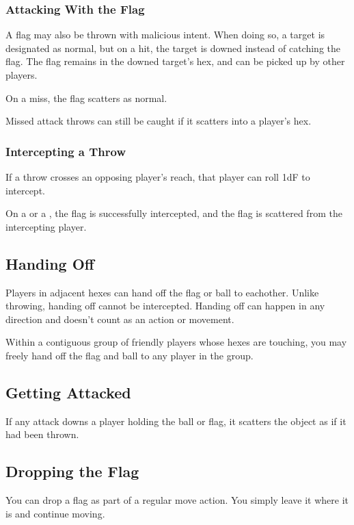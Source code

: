 \subsubsection{Attacking With the Flag} 
A flag may also be thrown with malicious intent.
When doing so, a target is designated as normal, but on a hit, the target is downed instead of catching the flag.
The flag remains in the downed target's hex, and can be picked up by other players.

On a miss, the flag scatters as normal.

\begin{note}
    Missed attack throws can still be caught if it scatters into a player's hex.
\end{note}

\subsubsection{Intercepting a Throw} 
If a throw crosses an opposing player's reach, that player can roll 1dF to intercept.

On a \plus{} or a \blank{}, the flag is successfully intercepted, and the flag is scattered from the intercepting player.

\subsection{Handing Off}\label{handing-off}
Players in adjacent hexes can hand off the flag or ball to eachother.
Unlike throwing, handing off cannot be intercepted.
Handing off can happen in any direction and doesn't count as an action or movement.

\begin{note}
    Within a contiguous group of friendly players whose hexes are touching, you may freely hand off the flag and ball to any player in the group.
\end{note}

\subsection{Getting Attacked}
If any attack downs a player holding the ball or flag, it scatters the object as if it had been thrown.

\subsection{Dropping the Flag}
You can drop a flag as part of a regular move action.
You simply leave it where it is and continue moving.

